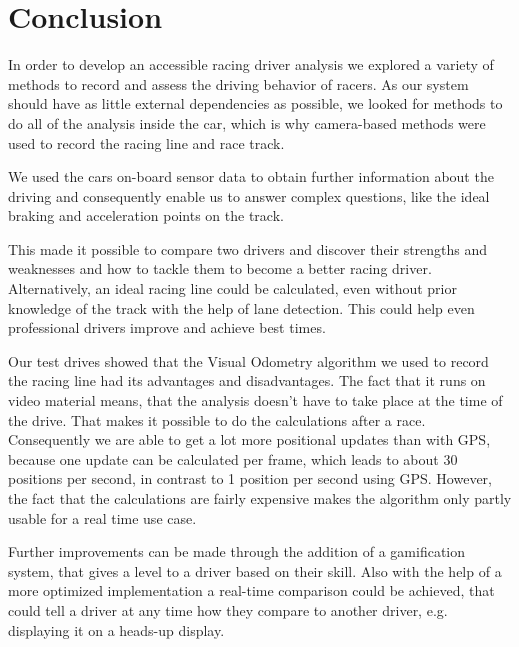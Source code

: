 \section{Conclusion}
\label{sec:conclusion}
In order to develop an accessible racing driver analysis we explored a variety of methods to record and assess the driving behavior of racers. As our system should have as little external dependencies as possible, we looked for methods to do all of the analysis inside the car, which is why camera-based methods were used to record the racing line and race track. 

We used the cars on-board sensor data to obtain further information about the driving and consequently enable us to answer complex questions, like the ideal braking and acceleration points on the track.

This made it possible to compare two drivers and discover their strengths and weaknesses and how to tackle them to become a better racing driver. Alternatively, an ideal racing line could be calculated, even without prior knowledge of the track with the help of lane detection. This could help even professional drivers improve and achieve best times.

Our test drives showed that the Visual Odometry algorithm we used to record the racing line had its advantages and disadvantages. The fact that it runs on video material means, that the analysis doesn't have to take place at the time of the drive. That makes it possible to do the calculations after a race. Consequently we are able to get a lot more positional updates than with GPS, because one update can be calculated per frame, which leads to about 30 positions per second, in contrast to 1 position per second using GPS. 
However, the fact that the calculations are fairly expensive makes the algorithm only partly usable for a real time use case.

Further improvements can be made through the addition of a gamification system, that gives a level to a driver based on their skill. Also with the help of a more optimized implementation a real-time comparison could be achieved, that could tell a driver at any time how they compare to another driver, e.g. displaying it on a heads-up display.
\clearpage
